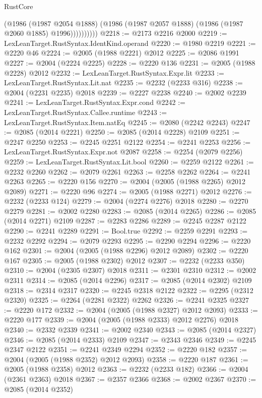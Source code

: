 \begin{lexlean}{RustCore}
\begin{coremodule}
                  (@1986
                    (@1987 @2054 @1888)
                    (@1986 (@1987 @2057 @1888) (@1986 (@1987 @2060 @1885) @1996))))))))))
@2218 := @2173 @2216 @2000
@2219 := LexLeanTarget.RustSyntax.IdentKind.operand
@2220 := @1980 @2219
@2221 := @2220 @46
@2224 := @2005 (@1988 @2221) @2012
@2225 := @2086 @1991
@2227 := @2004 (@2224 @2225)
@2228 := @2220 @136
@2231 := @2005 (@1988 @2228) @2012
@2232 := LexLeanTarget.RustSyntax.Expr.lit
@2233 := LexLeanTarget.RustSyntax.Lit.nat
@2235 := @2232 (@2233 @316)
@2238 := @2004 (@2231 @2235) @2018
@2239 := @2227 @2238
@2240 := @2002 @2239
@2241 := LexLeanTarget.RustSyntax.Expr.cond
@2242 := LexLeanTarget.RustSyntax.Callee.runtime
@2243 := LexLeanTarget.RustSyntax.Item.natEq
@2245 := @2080 (@2242 @2243)
@2247 := @2085 (@2014 @2221)
@2250 := @2085 (@2014 @2228) @2109
@2251 := @2247 @2250
@2253 := @2245 @2251 @2122
@2254 := @2241 @2253
@2256 := LexLeanTarget.RustSyntax.Expr.not @2087
@2258 := @2254 (@2079 @2256)
@2259 := LexLeanTarget.RustSyntax.Lit.bool
@2260 := @2259 @2122
@2261 := @2232 @2260
@2262 := @2079 @2261
@2263 := @2258 @2262
@2264 := @2241 @2263
@2265 := @2220 @156
@2270 := @2004 (@2005 (@1988 @2265) @2012 @2089)
@2271 := @2220 @96
@2274 := @2005 (@1988 @2271) @2012
@2276 := @2232 (@2233 @124)
@2279 := @2004 (@2274 @2276) @2018
@2280 := @2270 @2279
@2281 := @2002 @2280
@2283 := @2085 (@2014 @2265)
@2286 := @2085 (@2014 @2271) @2109
@2287 := @2283 @2286
@2289 := @2245 @2287 @2122
@2290 := @2241 @2289
@2291 := Bool.true
@2292 := @2259 @2291
@2293 := @2232 @2292
@2294 := @2079 @2293
@2295 := @2290 @2294
@2296 := @2220 @162
@2301 := @2004 (@2005 (@1988 @2296) @2012 @2089)
@2302 := @2220 @167
@2305 := @2005 (@1988 @2302) @2012
@2307 := @2232 (@2233 @350)
@2310 := @2004 (@2305 @2307) @2018
@2311 := @2301 @2310
@2312 := @2002 @2311
@2314 := @2085 (@2014 @2296)
@2317 := @2085 (@2014 @2302) @2109
@2318 := @2314 @2317
@2320 := @2245 @2318 @2122
@2322 := @2295 (@2312 @2320)
@2325 := @2264 (@2281 @2322) @2262
@2326 := @2241 @2325
@2327 := @2220 @172
@2332 := @2004 (@2005 (@1988 @2327) @2012 @2093)
@2333 := @2220 @177
@2339 := @2004 (@2005 (@1988 @2333) @2012 @2276) @2018
@2340 := @2332 @2339
@2341 := @2002 @2340
@2343 := @2085 (@2014 @2327)
@2346 := @2085 (@2014 @2333) @2109
@2347 := @2343 @2346
@2349 := @2245 @2347 @2122
@2351 := @2241 @2349 @2294
@2352 := @2220 @182
@2357 := @2004 (@2005 (@1988 @2352) @2012 @2093)
@2358 := @2220 @187
@2361 := @2005 (@1988 @2358) @2012
@2363 := @2232 (@2233 @182)
@2366 := @2004 (@2361 @2363) @2018
@2367 := @2357 @2366
@2368 := @2002 @2367
@2370 := @2085 (@2014 @2352)

\end{coremodule}
\end{lexlean}
